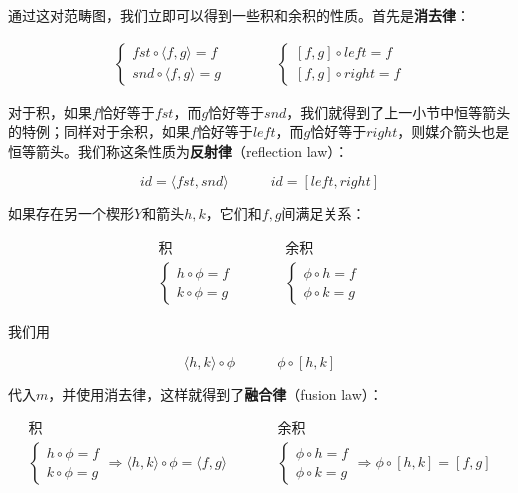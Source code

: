 \documentclass{article}
\begin{document}
通过这对范畴图，我们立即可以得到一些积和余积的性质。首先是\textbf{消去律}：

\[
\begin{array}{rcl}
\begin{cases}
fst \circ \langle f, g \rangle = f \\
snd \circ \langle f, g \rangle = g
\end{cases}
& \quad \quad &
\begin{cases}
[f, g] \circ left = f \\
[f, g] \circ right = f
\end{cases}
\end{array}
\]

对于积，如果$f$恰好等于$fst$，而$g$恰好等于$snd$，我们就得到了上一小节中恒等箭头的特例；同样对于余积，如果$f$恰好等于$left$，而$g$恰好等于$right$，则媒介箭头也是恒等箭头。我们称这条性质为\textbf{反射律}（reflection law）：

\[
id = \langle fst, snd \rangle \quad \quad \quad id = [left, right]
\]

如果存在另一个楔形$Y$和箭头$h, k$，它们和$f, g$间满足关系：

\[
\begin{array}{ccc}
  \text{积} & & \text{余积} \\
  \begin{cases}
  h \circ \phi = f \\
  k \circ \phi = g
  \end{cases}
  & \quad \quad &
  \begin{cases}
  \phi \circ h = f \\
  \phi \circ k = g
  \end{cases}
\end{array}
\]

我们用

\[
\langle h, k \rangle \circ \phi \quad \quad \quad \phi \circ [h, k]
\]

代入$m$，并使用消去律，这样就得到了\textbf{融合律}（fusion law）：

\[
\begin{array}{ccc}
  \text{积} & & \text{余积} \\
  \begin{cases}
  h \circ \phi = f \\
  k \circ \phi = g
  \end{cases} \Rightarrow
    \langle h, k \rangle \circ \phi = \langle f, g \rangle
  & \quad \quad &
  \begin{cases}
  \phi \circ h = f \\
  \phi \circ k = g
  \end{cases} \Rightarrow
    \phi \circ [h, k] = [f, g]
\end{array}
\]
\end{document}

